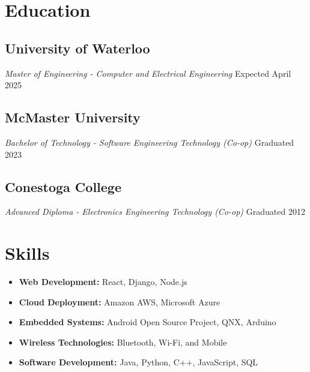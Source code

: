 \documentclass[a4paper,11pt]{article}  %
\begin{document}
\section{Education}

\subsection*{University of Waterloo}
\textit{Master of Engineering - Computer and Electrical Engineering} \hfill Expected April 2025

\subsection*{McMaster University}
\textit{Bachelor of Technology - Software Engineering Technology (Co-op)} \hfill Graduated 2023

\subsection*{Conestoga College}
\textit{Advanced Diploma - Electronics Engineering Technology (Co-op)} \hfill Graduated 2012

\section{Skills}

\begin{itemize}
    \item \textbf{Web Development:} React, Django, Node.js
    \item \textbf{Cloud Deployment:} Amazon AWS, Microsoft Azure
    \item \textbf{Embedded Systems:} Android Open Source Project, QNX, Arduino
    \item \textbf{Wireless Technologies:} Bluetooth, Wi-Fi, and Mobile
    \item \textbf{Software Development:} Java, Python, C++, JavaScript, SQL
\end{itemize}
\end{document}
